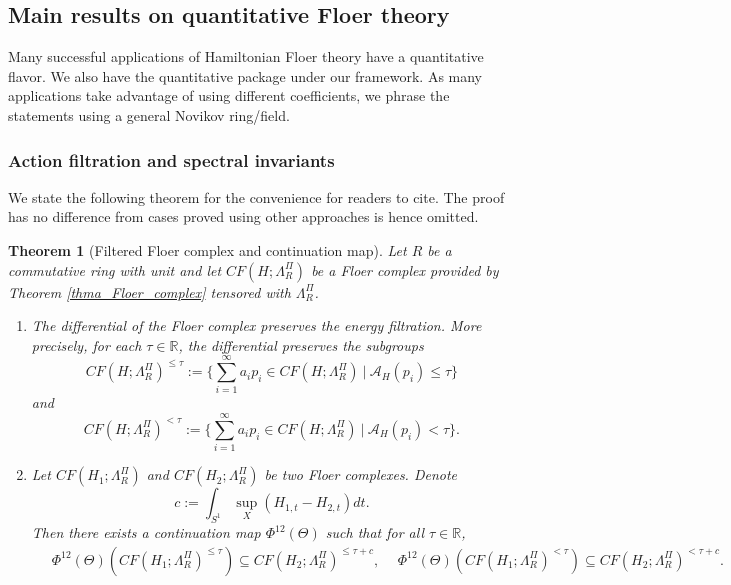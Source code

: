 \documentclass[reqno, 10pt]{amsart}
\numberwithin{equation}{section}
\numberwithin{equation}{section}
\newtheorem{thma}{Theorem}
\renewcommand{\subset}{\subseteq}
\theoremstyle{definition}
\theoremstyle{remark}
\newcommand{\beqn}{\begin{equation*}}
\newcommand{\eeqn}{\end{equation*}}
\newcommand{\mb}{\mathbb}
\newcommand{\mc}{\mathcal}
\begin{document}
\subsection{Main results on quantitative Floer theory}

Many successful applications of Hamiltonian Floer theory have a quantitative flavor. We also have the quantitative package under our framework. As many applications take advantage of using different coefficients, we phrase the statements using a general Novikov ring/field.

\subsubsection{Action filtration and spectral invariants}

We state the following theorem for the convenience for readers to cite. The proof has no difference from cases proved using other approaches is hence omitted. 

\begin{thma}[Filtered Floer complex and continuation map]\label{thma_Floer_filtered} Let $R$ be a commutative ring with unit and let $CF (H; \Lambda_R^\Pi)$ be a Floer complex provided by Theorem \ref{thma_Floer_complex} tensored with $\Lambda_R^\Pi$.
\begin{enumerate}

\item The differential of the Floer complex preserves the energy filtration. More precisely, for each $\tau \in {\mb R}$, the differential preserves the subgroups
\beqn
CF (H; \Lambda_R^\Pi)^{\leq \tau}:= \Big\{ \sum_{i=1}^\infty a_i p_i \in CF (H; \Lambda_R^\Pi)\ |\ {\mc A}_H(p_i) \leq \tau \Big\}
\eeqn
and 
\beqn
CF (H; \Lambda_R^\Pi)^{<\tau}:= \Big\{\sum_{i=1}^\infty a_i p_i\in CF (H; \Lambda_R^\Pi)\ |\ {\mc A}_H(p_i) < \tau \Big\}.
\eeqn

\item Let $CF(H_1; \Lambda_R^\Pi)$ and $CF (H_2; \Lambda_R^\Pi)$ be two Floer complexes. Denote
\beqn
c:= \int_{S^1} \sup_X (H_{1, t} - H_{2, t}) dt.
\eeqn
Then there exists a continuation map $\Phi^{12}(\Theta)$ such that for all $\tau \in {\mb R}$,
\begin{align*}
&\ \Phi^{12}(\Theta) ( CF(H_1; \Lambda_R^\Pi)^{\leq \tau}) \subset CF (H_2; \Lambda_R^\Pi )^{\leq \tau + c},\ &\ \Phi^{12}(\Theta) (CF(H_1; \Lambda_R^\Pi)^{<\tau}) \subset CF(H_2; \Lambda_R^\Pi)^{<\tau + c}.
\end{align*}
\end{enumerate}
\end{thma}
\end{document}

